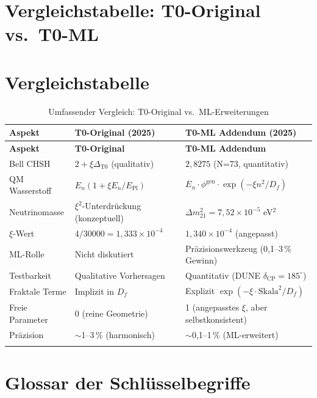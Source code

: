 	\section{Vergleichstabelle: T0-Original vs.~T0-ML}
	
	\section*{Vergleichstabelle}
	\begin{longtable}{p{2.4cm}p{4.0cm}p{4.0cm}}
		\toprule
		\textbf{Aspekt} & \textbf{T0-Original (2025)} & \textbf{T0-ML Addendum (2025)} \\
		\midrule
		\endfirsthead
		\toprule
		\textbf{Aspekt} & \textbf{T0-Original} & \textbf{T0-ML Addendum} \\
		\midrule
		\endhead
		
		Bell CHSH & $2 + \xi\Delta_{\text{T0}}$ (qualitativ) & $2{,}8275$ (N=73, quantitativ) \\
		QM Wasserstoff & $E_n(1+\xi E_n/E_{\text{Pl}})$ & $E_n \cdot \phi^{\text{gen}} \cdot \exp(-\xi n^2/D_f)$ \\
		Neutrinomasse & $\xi^2$-Unterdrückung (konzeptuell) & $\Delta m_{21}^2=7{,}52\times10^{-5}$ eV$^2$ \\
		$\xi$-Wert & $4/30000=1{,}333\times10^{-4}$ & $1{,}340\times10^{-4}$ (angepasst) \\
		ML-Rolle & Nicht diskutiert & Präzisionswerkzeug (0{,}1--3\,\% Gewinn) \\
		Testbarkeit & Qualitative Vorhersagen & Quantitativ (DUNE $\delta_{\text{CP}}=185^\circ$) \\
		Fraktale Terme & Implizit in $D_f$ & Explizit $\exp(-\xi \cdot \text{Skala}^2/D_f)$ \\
		Freie Parameter & 0 (reine Geometrie) & 1 (angepasstes $\xi$, aber selbstkonsistent) \\
		Präzision & $\sim$1--3\,\% (harmonisch) & $\sim$0{,}1--1\,\% (ML-erweitert) \\
		\bottomrule
		\caption{Umfassender Vergleich: T0-Original vs.~ML-Erweiterungen}
	\end{longtable}
	
\section{Glossar der Schlüsselbegriffe}
	
